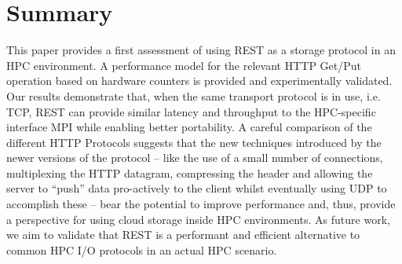 \documentclass[runningheads]{llncs}
\begin{document}
\section{Summary}
This paper provides a first assessment of using REST as a storage protocol in an HPC environment. A performance model for the relevant HTTP Get/Put operation based on hardware counters is provided and experimentally validated. Our results demonstrate that, when the same transport protocol is in use, i.e. TCP, REST can provide similar latency and throughput to the HPC-specific interface MPI while enabling better portability.
A careful comparison of the different HTTP Protocols suggests that the new techniques introduced by the newer versions of the protocol -- like the use of a small number of connections, multiplexing the HTTP datagram, compressing the header and allowing the server to “push” data pro-actively to the client whilst eventually using UDP to accomplish these -- bear the potential to improve performance and, thus, provide a perspective for using cloud storage inside HPC environments.
As future work, we aim to validate that REST is a performant and efficient alternative to common HPC I/O protocols in an actual HPC scenario.

\nocite{*}
%
%
%





\end{document}
